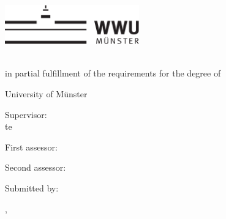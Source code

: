 \thispagestyle{empty}

\begin{center}
    \includegraphics[height=1.7cm]{logos/wwu.pdf}
    \hfill
    \par
    \vspace*{8ex}
    {
        \linespread{0.9}
        \LARGE
        \printtitle
        \par
    }
    \normalsize
    \vspace*{8ex}
    \large
    \textsc{\printtype}\\
    \normalsize
    in partial fulfillment of the requirements for the degree of\\
    \large
    \textsc{\printdegree}
    \par
    \normalsize
    \vspace*{6ex}
    University of Münster\\
    \printinstitute
\end{center}

\par
\vspace*{6ex}
Supervisor:\\te
\large
\textit{\printsupervisor}

\par
\normalsize
\vspace*{2ex}
First assessor:\\
\large
\textit{\printfirstassessor}

\par
\normalsize
\vspace*{2ex}
Second assessor:\\
\large
\textit{\printsecondassessor}

\par
\normalsize
\vspace*{2ex}
Submitted by:\\
\large
\textit{\printname}

\par
\normalsize
\vspace*{4ex}
\printcity, \makeatletter
\monthname
\makeatother~\the\year
